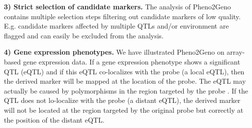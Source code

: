 {\bf 3) Strict selection of candidate markers.}
The analysis of Pheno2Geno contains multiple selection steps filtering out candidate markers of 
low quality. E.g. candidate markers affected by multiple QTLs and/or environment are flagged and 
can easily be excluded from the analysis.

{\bf 4) Gene expression phenotypes.}
We have illustrated Pheno2Geno on array-based gene expression data. If a gene expression 
phenotype shows a significant QTL (eQTL) and if this eQTL co-localizes with the probe (a 
local eQTL), then the derived marker will be mapped at the location of the probe. The eQTL 
may actually be caused by polymorphisms in the region targeted by the probe \cite{Alberts:2005, 
Alberts:2007}. If the QTL does not lo-localize with the probe (a distant eQTL), the derived 
marker will not be located at the region targeted by the original probe but correctly at the 
position of the distant eQTL.

